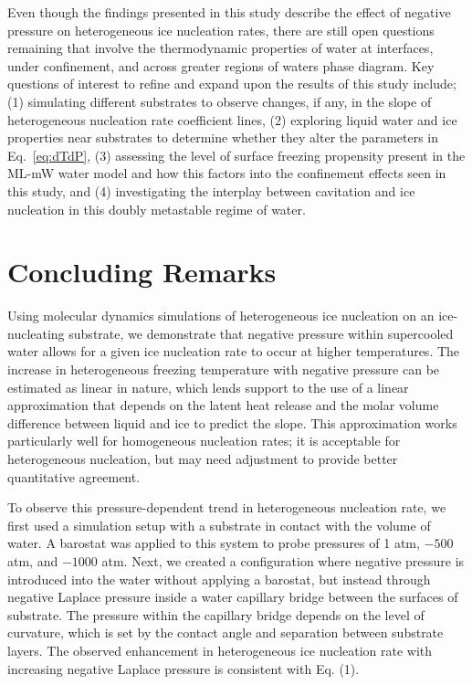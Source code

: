 \documentclass[journal abbreviation, manuscript]{copernicus}
\begin{document}
Even though the findings presented in this study describe the effect of negative pressure on heterogeneous ice nucleation rates, there are still open questions remaining that involve the thermodynamic properties of water at interfaces, under confinement, and across greater regions of waters phase diagram. Key questions of interest to refine and expand upon the results of this study include; (1) simulating different substrates to observe changes, if any, in the slope of heterogeneous nucleation rate coefficient lines, (2) exploring liquid water and ice properties near substrates to determine whether they alter the parameters in Eq.~\ref{eq:dTdP}, (3) assessing the level of surface freezing propensity present in the ML-mW water model and how this factors into the confinement effects seen in this study, and (4) investigating the interplay between cavitation and ice nucleation in this doubly metastable regime of water.


\section{Concluding Remarks}
Using molecular dynamics simulations of heterogeneous ice nucleation on an ice-nucleating substrate, we demonstrate that negative pressure within supercooled water allows for a given ice nucleation rate to occur at higher temperatures. The increase in heterogeneous freezing temperature with negative pressure can be estimated as linear in nature, which lends support to the use of a linear approximation that depends on the latent heat release and the molar volume difference between liquid and ice to predict the slope. This approximation works particularly well for homogeneous nucleation rates; it is acceptable for heterogeneous nucleation, but may need adjustment to provide better quantitative agreement.

To observe this pressure-dependent trend in heterogeneous nucleation rate, we first used a simulation setup with a substrate in contact with the volume of water. A barostat was applied to this system to probe pressures of 1 atm, $-500$ atm, and $-1000$ atm. Next, we created a configuration where negative pressure is introduced into the water without applying a barostat, but instead through negative Laplace pressure inside a water capillary bridge between the surfaces of substrate. The pressure within the capillary bridge depends on the level of curvature, which is set by the contact angle and separation between substrate layers. The observed enhancement in heterogeneous ice nucleation rate with increasing negative Laplace pressure is consistent with Eq. (1).
\end{document}
